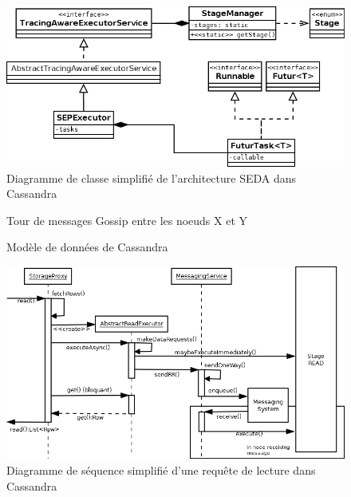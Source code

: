 \documentclass[12pt]{article}
\begin{document}
\begin{figure}[p]
	\centering
		\includegraphics[width=15cm]{images/architecture/stages_diagram.png}
	\caption{Diagramme de classe simplifié de l'architecture SEDA dans Cassandra \label{fig:stages_diagram}}
\end{figure}

\begin{figure}[p]
	\centering
		
	\caption{Tour de messages Gossip entre les noeuds X et Y \label{fig:round_gossip}}
\end{figure}

\begin{figure}[p]
	\centering
		
	\caption{Modèle de données de Cassandra \label{fig:keyspace}}
\end{figure}

\begin{figure}[p]
	\centering
		\includegraphics[width=15cm]{images/architecture/read_diagram.png}
	\caption{Diagramme de séquence simplifié d'une requête de lecture dans Cassandra \label{fig:read_diagram}}
\end{figure}
\end{document}
